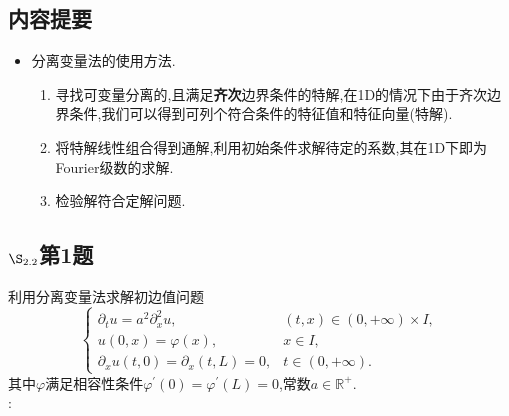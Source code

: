 \documentclass[12pt, a4paper]{ctexbook}
\begin{document}
    \subsection{内容提要}
    \begin{itemize}
        \item 分离变量法的使用方法.
        \begin{enumerate}
            \item 寻找可变量分离的,且满足{\bf 齐次}边界条件的特解,在1D的情况下由于齐次边界条件,我们可以得到可列个符合条件的特征值和特征向量(特解).
            \item 将特解线性组合得到通解,利用初始条件求解待定的系数,其在1D下即为Fourier级数的求解.
            \item 检验解符合定解问题.
        \end{enumerate}
    \end{itemize}
    \subsection{$\S_{2.2}$第1题}
    \kaishu{}利用分离变量法求解初边值问题
    \begin{equation*}
    \begin{cases}
    \partial_t u = a^2\partial_x^2 u, &(t,x) \in (0,+\infty) \times I,\\
    u(0,x)=\varphi(x), &x \in I,\\
    \partial_xu(t,0) = \partial_x(t,L)=0,&t \in (0,+\infty).
    \end{cases}
    \end{equation*}
    其中$\varphi$满足相容性条件$\varphi^{\prime}(0)=\varphi^{\prime}(L)=0$,常数$a \in \mathbb{R}^{+}$.\\
    
    \songti{}:\\
    
\end{document}
